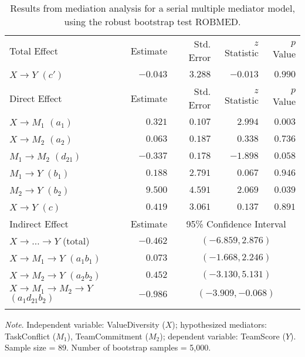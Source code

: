 \documentclass{article}\usepackage[]{graphicx}\usepackage[]{xcolor}
\begin{document}
\begin{table}[h!]
\caption{Results from mediation analysis for a serial multiple mediator model, using the robust bootstrap test ROBMED.}
\begin{center}
\begin{tabular}{lrrrr}
\hline\noalign{\smallskip}
Total Effect & Estimate & Std. Error & $z$ Statistic & $p$ Value \\ 
\noalign{\smallskip}\hline\noalign{\smallskip}
$X \rightarrow Y$ $(c')$ & $-0.043$ & $3.288$ & $-0.013$ & $0.990$ \\ 
\noalign{\smallskip}\hline\noalign{\smallskip}
Direct Effect & Estimate & Std. Error & $z$ Statistic & $p$ Value \\ 
\noalign{\smallskip}\hline\noalign{\smallskip}
$X \rightarrow M_{1}$ $(a_{1})$ & $0.321$ & $0.107$ & $2.994$ & $0.003$ \\ 
$X \rightarrow M_{2}$ $(a_{2})$ & $0.063$ & $0.187$ & $0.338$ & $0.736$ \\ 
$M_{1} \rightarrow M_{2}$ $(d_{21})$ & $-0.337$ & $0.178$ & $-1.898$ & $0.058$ \\ 
$M_{1} \rightarrow Y$ $(b_{1})$ & $0.188$ & $2.791$ & $0.067$ & $0.946$ \\ 
$M_{2} \rightarrow Y$ $(b_{2})$ & $9.500$ & $4.591$ & $2.069$ & $0.039$ \\ 
$X \rightarrow Y$ $(c)$ & $0.419$ & $3.061$ & $0.137$ & $0.891$ \\ 
\noalign{\smallskip}\hline\noalign{\smallskip}
Indirect Effect & Estimate & \multicolumn{3}{c}{95\% Confidence Interval} \\ 
\noalign{\smallskip}\hline\noalign{\smallskip}
$X \rightarrow  \ldots  \rightarrow Y$ (total) & $-0.462$ & \multicolumn{3}{c}{$(-6.859, 2.876)$} \\ 
$X \rightarrow M_{1} \rightarrow Y$ $(a_{1}b_{1})$ & $0.073$ & \multicolumn{3}{c}{$(-1.668, 2.246)$} \\ 
$X \rightarrow M_{2} \rightarrow Y$ $(a_{2}b_{2})$ & $0.452$ & \multicolumn{3}{c}{$(-3.130, 5.131)$} \\ 
$X \rightarrow M_{1} \rightarrow M_{2} \rightarrow Y$ $(a_{1}d_{21}b_{2})$ & $-0.986$ & \multicolumn{3}{c}{$(-3.909, -0.068)$} \\ 
\noalign{\smallskip}\hline
\end{tabular}
\end{center}
\emph{Note}. Independent variable: ValueDiversity ($X$); hypothesized mediators: TaskConflict ($M_{1}$), TeamCommitment ($M_{2}$); dependent variable: TeamScore ($Y$). Sample size = 89. Number of bootstrap samples = 5,000.
\end{table}
\end{document}
